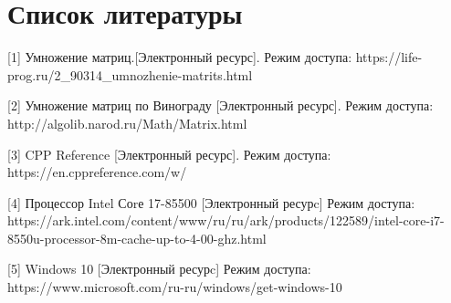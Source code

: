 \section*{Список литературы}

[1] Умножение матриц.[Электронный ресурс]. Режим доступа: https://life-prog.ru/2\_90314\_umnozhenie-matrits.html
 	    
[2] Умножение матриц по Винограду [Электронный ресурс]. Режим доступа: http://algolib.narod.ru/Math/Matrix.html
 	    
[3] CPP Reference [Электронный ресурс]. Режим доступа: https://en.cppreference.com/w/

[4] Процессор Intel Соrе 17-85500 [Электронный ресурc] Режим доступа: https://ark.intel.com/content/www/ru/ru/ark/products/122589/intel-core-i7-8550u-processor-8m-cache-up-to-4-00-ghz.html

[5] Windows 10 [Электронный ресурc] Режим доступа: https://www.microsoft.com/ru-ru/windows/get-windows-10